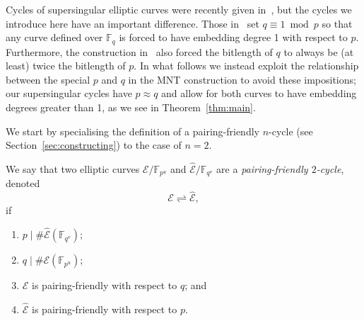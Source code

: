 \documentclass[version=preprint]{iacrcc}
\newcommand{\F}{\mathbb{F}}
\newcommand{\EC}{\mathcal{E}}
\begin{document}
Cycles of supersingular elliptic curves were recently given in~\cite{SantosCN24}, but the cycles we introduce here have an important difference. Those in~\cite{SantosCN24} set $q \equiv 1 \bmod{p}$ so that any curve defined over $\F_q$ is forced to have embedding degree 1 with respect to $p$. Furthermore, the construction in~\cite{SantosCN24} also forced the bitlength of $q$ to always be (at least) twice the bitlength of $p$. In what follows we instead exploit the relationship between the special $p$ and $q$ in the MNT construction to avoid these impositions; our supersingular cycles have $p \approx q$ and allow for both curves to have embedding degrees greater than 1, as we see in Theorem~\ref{thm:main}.

We start by specialising the definition of a pairing-friendly $n$-cycle (see Section~\ref{sec:constructing}) to the case of $n=2$. 

\begin{definition}\label{def:cycle}
We say that two elliptic curves $\EC/{\F_{p^u}}$ and $\hat{\EC}/{\F_{q^v}}$ are a \emph{pairing-friendly $2$-cycle}, denoted 
\[\EC \rightleftharpoons \hat{\EC},\]
if
\begin{enumerate}[label = (\roman*)]
\item $p \mid \#\hat{\EC}(\F_{q^v})$; \label{dec:pdiv}
\item $q \mid \#\EC(\F_{p^u})$; \label{dec:qdiv} 
\item $\EC$ is pairing-friendly with respect to $q$; and \label{def:pfq}
\item $\hat{\EC}$ is pairing-friendly with respect to $p$. \label{def:pfp}
\end{enumerate}
\end{definition}
\end{document}
